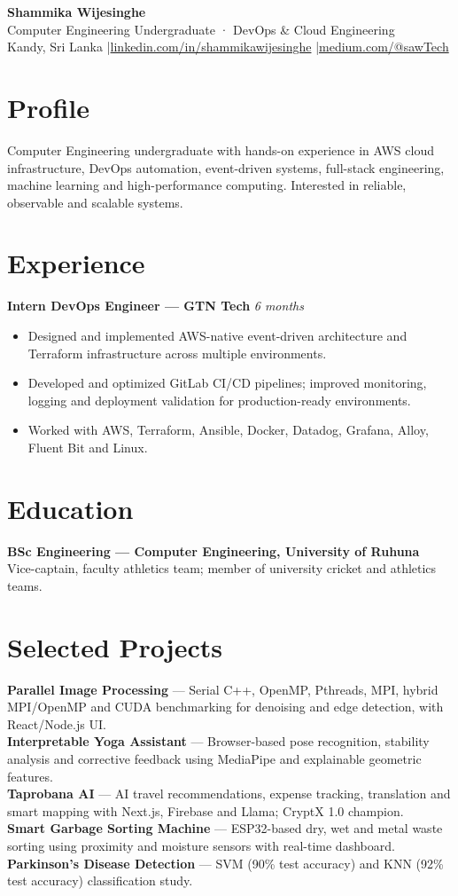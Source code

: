 \documentclass[10pt,a4paper]{article}
\begin{document}
{\Huge\bfseries Shammika Wijesinghe}\\[-1mm]
{\large Computer Engineering Undergraduate · DevOps \& Cloud Engineering}\\
Kandy, Sri Lanka \quad|\quad \href{https://www.linkedin.com/in/shammikawijesinghe/}{linkedin.com/in/shammikawijesinghe} \quad|\quad \href{https://medium.com/@sawTech}{medium.com/@sawTech}
\section*{Profile}
Computer Engineering undergraduate with hands-on experience in AWS cloud infrastructure, DevOps automation, event-driven systems, full-stack engineering, machine learning and high-performance computing. Interested in reliable, observable and scalable systems.
\section*{Experience}
\textbf{Intern DevOps Engineer — GTN Tech} \hfill \textit{6 months}
\begin{itemize}
\item Designed and implemented AWS-native event-driven architecture and Terraform infrastructure across multiple environments.
\item Developed and optimized GitLab CI/CD pipelines; improved monitoring, logging and deployment validation for production-ready environments.
\item Worked with AWS, Terraform, Ansible, Docker, Datadog, Grafana, Alloy, Fluent Bit and Linux.
\end{itemize}
\section*{Education}
\textbf{BSc Engineering — Computer Engineering, University of Ruhuna}\\
Vice-captain, faculty athletics team; member of university cricket and athletics teams.
\section*{Selected Projects}
\textbf{Parallel Image Processing} — Serial C++, OpenMP, Pthreads, MPI, hybrid MPI/OpenMP and CUDA benchmarking for denoising and edge detection, with React/Node.js UI.\\
\textbf{Interpretable Yoga Assistant} — Browser-based pose recognition, stability analysis and corrective feedback using MediaPipe and explainable geometric features.\\
\textbf{Taprobana AI} — AI travel recommendations, expense tracking, translation and smart mapping with Next.js, Firebase and Llama; CryptX 1.0 champion.\\
\textbf{Smart Garbage Sorting Machine} — ESP32-based dry, wet and metal waste sorting using proximity and moisture sensors with real-time dashboard.\\
\textbf{Parkinson's Disease Detection} — SVM (90\% test accuracy) and KNN (92\% test accuracy) classification study.
\end{document}
